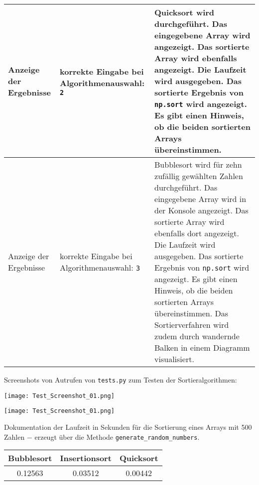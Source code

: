 \documentclass[a4paper]{article}
\begin{document}
\begin{exercise}{1}
\begin{center}
\begin{tabular}{| p{2.5cm} | p{3.2cm} | p{9cm} |}
		Anzeige der Ergebnisse & korrekte Eingabe bei Algorithmenauswahl: \newline \texttt{2}
		& Quicksort wird durchgef\"uhrt. Das eingegebene Array wird angezeigt. Das sortierte
		Array wird ebenfalls angezeigt. Die Laufzeit wird ausgegeben. Das sortierte Ergebnis von
		\texttt{np.sort} wird angezeigt. Es gibt einen Hinweis, ob die beiden sortierten Arrays
		\"ubereinstimmen. \\ \hline
		
		Anzeige der Ergebnisse & korrekte Eingabe bei Algorithmenauswahl: \newline \texttt{3}
		& Bubblesort wird f\"ur zehn zuf\"allig gew\"ahlten Zahlen durchgef\"uhrt. Das eingegebene
		Array wird in der Konsole angezeigt. Das sortierte Array wird ebenfalls dort angezeigt. Die
		Laufzeit wird ausgegeben. Das sortierte Ergebnis von \texttt{np.sort} wird angezeigt.
		Es gibt einen Hinweis, ob die beiden sortierten Arrays \"ubereinstimmen.
		Das Sortierverfahren wird zudem durch wandernde Balken in einem Diagramm
		visualisiert. \\ \hline	
		\end{tabular}
	\end{center}

\newpage

	Screenshots von Autrufen von \texttt{tests.py} zum Testen der Sortieralgorithmen:

	\begin{center}
		\texttt{[image: Test\_Screenshot\_01.png]}
	\end{center}
	\vspace*{1ex}
	\begin{center}
		\texttt{[image: Test\_Screenshot\_01.png]}
	\end{center}

\newpage

Dokumentation der Laufzeit in Sekunden f\"ur die Sortierung eines Arrays mit 500 Zahlen $-$ erzeugt \"uber
die Methode \texttt{generate\_random\_numbers}.

\begin{center}
	\begin{tabular}{| c | c | c |}
		\hline
		Bubblesort & Insertionsort & Quicksort\\ \hline \hline
		0.12563 & 0.03512 & 0.00442\\ \hline
	\end{tabular}
\end{center}



\end{exercise}
\end{document}
